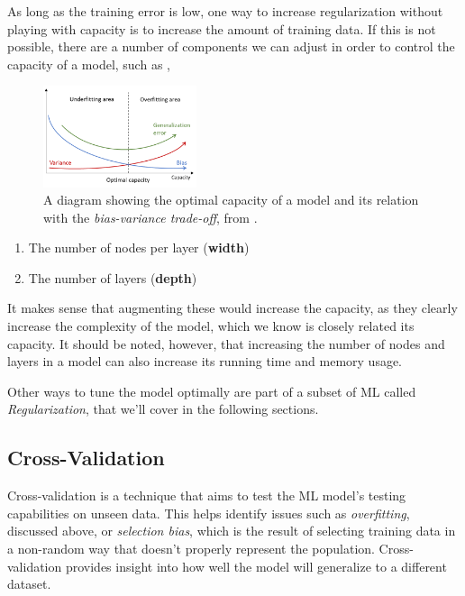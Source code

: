 \documentclass{article}
\begin{document}
  As long as the training error is low, one way to increase regularization without playing with capacity is to increase the amount of training data. If this is not possible, there are a number of components we can adjust in order to control the capacity of a model, such as \citep{capacity-Brownlee}, 
\begin{figure} %
    \centering
    \includegraphics[width=0.4\textwidth]{capacity}
    \caption{A diagram showing the optimal capacity of a model and its relation with the \textit{bias-variance trade-off}, from \citep{capacity-Kowalik}.}
    \label{fig:capacity}
\end{figure}
  \begin{enumerate}
    \item The number of nodes per layer (\textbf{width}) 
    \item The number of layers (\textbf{depth})
  \end{enumerate}
  It makes sense that augmenting these would increase the capacity, as they clearly increase the complexity of the model, which we know is closely related its capacity. It should be noted, however, that increasing the number of nodes and layers in a model can also increase its running time and memory usage. 

  Other ways to tune the model optimally are part of a subset of ML called \textit{Regularization}, that we'll cover in the following sections. 

  \subsection{Cross-Validation}%
  \label{sub:Cross-Validation}
Cross-validation is a technique that aims to test the ML model's testing capabilities on unseen data. This helps identify issues such as \textit{overfitting}, discussed above, or \textit{selection bias}, which is the result of selecting training data in a non-random way that doesn't properly represent the population. Cross-validation provides insight into how well the model will generalize to a different dataset.
\end{document}
